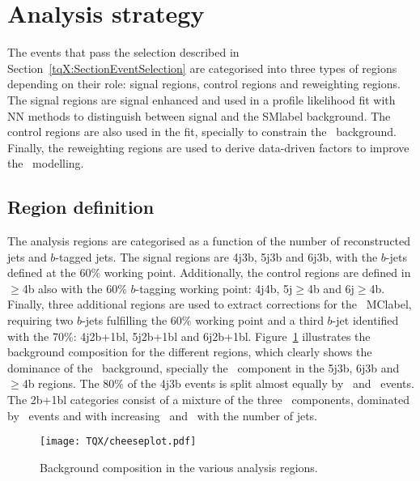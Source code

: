 \section{Analysis strategy}
The events that pass the selection described in Section~\ref{tqX:SectionEventSelection} are categorised into three types of regions depending on their role: signal regions, control regions and reweighting regions. The signal regions are signal enhanced and used in a profile likelihood fit with NN methods to distinguish between signal and the \acrshort{SMlabel} background. The control regions are also used in the fit, specially to constrain the \ttb\ background. Finally, the reweighting regions are used to derive data-driven factors to improve the \ttbar\ modelling.

\subsection{Region definition}

The analysis regions are categorised as a function of the number of reconstructed jets and $b$-tagged jets. The signal regions are 4j3b, 5j3b and 6j3b, with the $b$-jets defined at the 60\% working point. Additionally, the control regions are defined in $\geq$4b also with the 60\% $b$-tagging working point: 4j4b, 5j$\geq$4b and 6j$\geq$4b. Finally, three additional regions are used to extract corrections for the \ttbar\ \acrshort{MClabel}, requiring two $b$-jets fulfilling the 60\% working point and a third $b$-jet identified with the 70\%: 4j2b+1bl, 5j2b+1bl and 6j2b+1bl. Figure~\ref{tqX:cheeseplots} illustrates the background composition for the different regions, which clearly shows the dominance of the \ttbar\ background, specially the \ttb\ component in the 5j3b, 6j3b and $\geq$4b regions. The 80\% of the 4j3b events is split almost equally by \ttb\ and \ttl\ events. The 2b+1bl categories consist of a mixture of the three \ttbar\ components, dominated by \ttl\ events and with increasing \ttc\ and \ttb\ with the number of jets.

\begin{figure}[htbp]
    \RawFloats
    \begin{center}
    \texttt{[image: TQX/cheeseplot.pdf]}
    \caption{
        Background composition in the various analysis regions.
    }
    \label{tqX:cheeseplots}
    \end{center}
\end{figure}

